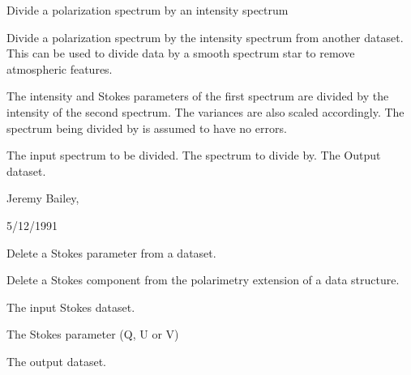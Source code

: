 \begin{manroutinedescription}
        Divide a polarization spectrum by an intensity spectrum

        Divide a polarization spectrum by the intensity spectrum from another
        dataset. This can be used to divide data by a smooth spectrum star
        to remove atmospheric features.

        The intensity and Stokes parameters of the first spectrum are
        divided by the intensity of the second spectrum. The variances are
        also scaled accordingly. The spectrum being divided by is assumed
        to have no errors.

\begin{manparametertable}
  The %
input spectrum to be divided.
  The %
spectrum to divide by.
  The %
Output dataset.

\end{manparametertable}
         Jeremy Bailey, {}

         5/12/1991

\end{manroutinedescription}
\begin{manroutinedescription}
        Delete a Stokes parameter from a dataset.

        Delete a Stokes component from the polarimetry
        extension of a data structure.

\begin{manparametertable}
\begin{manitemize}
\manitemizeitem The input Stokes dataset.
\end{manitemize}
\begin{manitemize}
\manitemizeitem The Stokes parameter (Q, U or V)
\end{manitemize}
\begin{manitemize}
\manitemizeitem The output dataset.
\end{manitemize}

\end{manparametertable}
\end{manroutinedescription}
